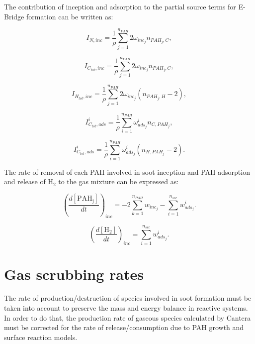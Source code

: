 The contribution of inception and adsorption to the partial source terms for E-Bridge formation can be written as:

\begin{equation}
	I_{N,{inc}} = \frac{1}{\rho}
	\sum_{j=1}^{n_{PAH}}
	2\omega_{inc_{j}} 
	n_{PAH_j,C}
	\label{eqn:IN_inc_ebri},
\end{equation}

\begin{equation}
	I_{C_{tot},{inc}} = \frac{1}{\rho}
	\sum_{j=1}^{n_{PAH}}
	2\omega_{inc_{j}} 
	n_{PAH_j,C}
	\label{eqn:ICtot_inc_ebri},
\end{equation}

\begin{equation}
	I_{H_{tot},{inc}} = \frac{1}{\rho}
	\sum_{j=1}^{n_{PAH}}
	2\omega_{inc_{j}} 
	\left(
	n_{PAH_j,H}-2
	\right)
	\label{eqn:IHtot_inc_ebri},
\end{equation}

\begin{equation}
	I^i_{C_{tot},ads} =
	\frac{1}{\rho}
	\sum_{i=1}^{n_{PAH}}
	\omega^i_{ads_j}
	n_{C,PAH_j}
	\label{eqn:ICtotads_ebri},
\end{equation}

\begin{equation}
	I^i_{C_{tot},ads} =
	\frac{1}{\rho}
	\sum_{i=1}^{n_{PAH}}
	\omega^i_{ads_j}
	\left(n_{H,PAH_j}-2\right)
	\label{eqn:IHtotads_ebri}.
\end{equation}

The rate of removal of each PAH involved in soot inception and PAH adsorption and release of $\mathrm{H_2}$ to the gas mixture can be expressed as:

\begin{equation}
	\left(
	\frac{d\left[{\mathrm{PAH_j}}\right]}{dt}
	\right)_{inc}
	= 
	-2\sum_{k=1}^{n_{PAH}}w_{inc_{j}}-\sum_{i=1}^{n_{sec}}w^i_{ads_j}
	\label{eqn:PAHscrub_ebri}.
\end{equation}

\begin{equation}
	\left(
	\frac{d\left[{\mathrm{H_2}}\right]}{dt}
	\right)_{inc}
	= 
	\sum_{i=1}^{n_{sec}}w^i_{ads_j}
	\label{eqn:H2scrub_ebri}.
\end{equation}

\section{Gas scrubbing rates}

The rate of production/destruction of species involved in soot formation must be taken into account to preserve the mass and energy balance in reactive systems. In order to do that, the production rate of gaseous species calculated by Cantera must be corrected for the rate of release/consumption due to PAH growth and surface reaction models.

